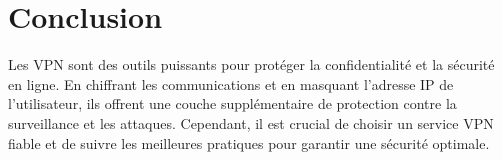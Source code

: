 \documentclass{report}
\begin{document}
\chapter{Conclusion}
Les VPN sont des outils puissants pour protéger la confidentialité et la sécurité en ligne. En chiffrant les communications et en masquant l'adresse IP de l'utilisateur, ils offrent une couche supplémentaire de protection contre la surveillance et les attaques. Cependant, il est crucial de choisir un service VPN fiable et de suivre les meilleures pratiques pour garantir une sécurité optimale.

\printbibliography %
\end{document}
